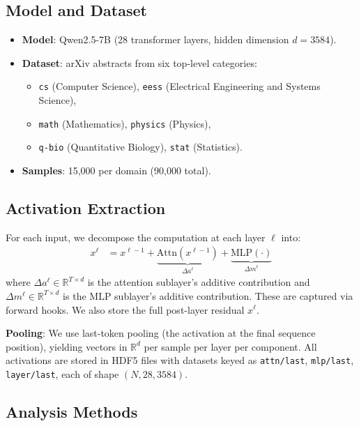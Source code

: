 \documentclass[11pt]{article}
\newcommand{\attn}{\Delta a}
\newcommand{\mlp}{\Delta m}
\begin{document}
\subsection{Model and Dataset}

\begin{itemize}
    \item \textbf{Model}: Qwen2.5-7B (28 transformer layers, hidden dimension $d = 3584$).
    \item \textbf{Dataset}: arXiv abstracts from six top-level categories:
    \begin{itemize}
        \item \texttt{cs} (Computer Science), \texttt{eess} (Electrical Engineering and Systems Science),
        \item \texttt{math} (Mathematics), \texttt{physics} (Physics),
        \item \texttt{q-bio} (Quantitative Biology), \texttt{stat} (Statistics).
    \end{itemize}
    \item \textbf{Samples}: 15{,}000 per domain (90{,}000 total).
\end{itemize}

\subsection{Activation Extraction}

For each input, we decompose the computation at each layer $\ell$ into:
\begin{align}
    x^\ell &= x^{\ell-1} + \underbrace{\text{Attn}(x^{\ell-1})}_{\attn^\ell} + \underbrace{\text{MLP}(\cdot)}_{\mlp^\ell}
\end{align}
where $\attn^\ell \in \mathbb{R}^{T \times d}$ is the attention sublayer's additive contribution and $\mlp^\ell \in \mathbb{R}^{T \times d}$ is the MLP sublayer's additive contribution. These are captured via forward hooks. We also store the full post-layer residual $x^\ell$.

\textbf{Pooling}: We use last-token pooling (the activation at the final sequence position), yielding vectors in $\mathbb{R}^d$ per sample per layer per component. All activations are stored in HDF5 files with datasets keyed as \texttt{attn/last}, \texttt{mlp/last}, \texttt{layer/last}, each of shape $(N, 28, 3584)$.

\subsection{Analysis Methods}
\end{document}
